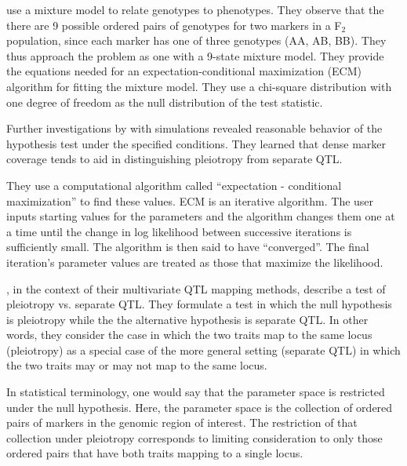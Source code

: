 \documentclass[oneside]{book}\usepackage[]{graphicx}\usepackage[]{color}
\begin{document}
\citet{jiang1995multiple} use a mixture model to relate genotypes to phenotypes. 
They observe that the there are 9 possible ordered pairs of genotypes for two markers in a F$_2$ population, since each marker has one of three genotypes (AA, AB, BB).
They thus approach the problem as one with a 9-state mixture model. 
They provide the equations needed for an expectation-conditional maximization
(ECM) algorithm for fitting the mixture model.
They use a chi-square distribution with one degree of freedom as the
null distribution of the test statistic. 

Further investigations by \citet{jiang1995multiple} with simulations revealed
reasonable behavior of the hypothesis test under the specified conditions. 
They learned that dense marker coverage tends to aid in distinguishing pleiotropy
from separate QTL. 










They use a computational algorithm called ``expectation - conditional maximization'' to find these values. 
ECM is an iterative algorithm. 
The user inputs starting values for the parameters and the algorithm changes them one at a
time until the change in log likelihood between successive iterations is sufficiently small.
The algorithm is then said to have ``converged''. 
The final iteration’s parameter values are treated as those that maximize the likelihood.


\citet{jiang1995multiple}, in the context of their multivariate QTL mapping methods, 
describe a test of pleiotropy vs. separate QTL. 
They formulate a test in which the null hypothesis
is pleiotropy while the the alternative hypothesis is separate QTL.
In other words, they consider the case in which the two traits map to the same locus
(pleiotropy) as a special case of the more general setting (separate QTL)
in which the two traits may or may not map to the same locus.

In statistical terminology, one would say that the parameter space is restricted under the null hypothesis. Here, the parameter space is the collection of ordered pairs of markers in the genomic region of interest. The restriction of that collection under pleiotropy corresponds to limiting consideration to only those ordered pairs that have both traits mapping to a single locus. 
\end{document}
